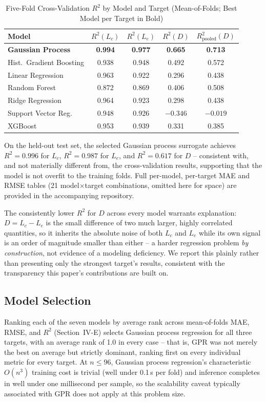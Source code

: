 \documentclass[conference]{IEEEtran}
\begin{document}
\begin{table}[!t]
\caption{Five-Fold Cross-Validation $R^2$ by Model and Target (Mean-of-Folds; Best Model per Target in Bold)}
\label{tab:cvresults}
\centering
\footnotesize
\setlength{\tabcolsep}{3pt}
\begin{tabular}{@{}lccc c@{}}
\toprule
\textbf{Model} & $R^2(L_c)$ & $R^2(L_e)$ & $R^2(D)$ & $R^2_{\text{pooled}}(D)$ \\
\midrule
\textbf{Gaussian Process} & \textbf{0.994} & \textbf{0.977} & \textbf{0.665} & \textbf{0.713} \\
Hist.\ Gradient Boosting & 0.938 & 0.948 & 0.492 & 0.572 \\
Linear Regression & 0.963 & 0.922 & 0.296 & 0.438 \\
Random Forest & 0.872 & 0.869 & 0.406 & 0.508 \\
Ridge Regression & 0.964 & 0.923 & 0.298 & 0.438 \\
Support Vector Reg. & 0.948 & 0.926 & $-0.346$ & $-0.019$ \\
XGBoost & 0.953 & 0.939 & 0.331 & 0.385 \\
\bottomrule
\end{tabular}
\end{table}

On the held-out test set, the selected Gaussian process surrogate achieves $R^2=0.996$ for $L_c$, $R^2=0.987$ for $L_e$, and $R^2=0.617$ for $D$ -- consistent with, and not materially different from, the cross-validation results, supporting that the model is not overfit to the training folds. Full per-model, per-target MAE and RMSE tables (21 model$\times$target combinations, omitted here for space) are provided in the accompanying repository.

The consistently lower $R^2$ for $D$ across every model warrants explanation: $D=L_c-L_e$ is the small difference of two much larger, highly correlated quantities, so it inherits the absolute noise of both $L_c$ and $L_e$ while its own signal is an order of magnitude smaller than either -- a harder regression problem \emph{by construction}, not evidence of a modeling deficiency. We report this plainly rather than presenting only the strongest target's results, consistent with the transparency this paper's contributions are built on.

\subsection{Model Selection}
Ranking each of the seven models by average rank across mean-of-folds MAE, RMSE, and $R^2$ (Section~IV-E) selects Gaussian process regression for all three targets, with an average rank of 1.0 in every case -- that is, GPR was not merely the best on average but strictly dominant, ranking first on every individual metric for every target. At $n\leq96$, Gaussian process regression's characteristic $O(n^3)$ training cost is trivial (well under 0.1\,s per fold) and inference completes in well under one millisecond per sample, so the scalability caveat typically associated with GPR does not apply at this problem size.
\end{document}
